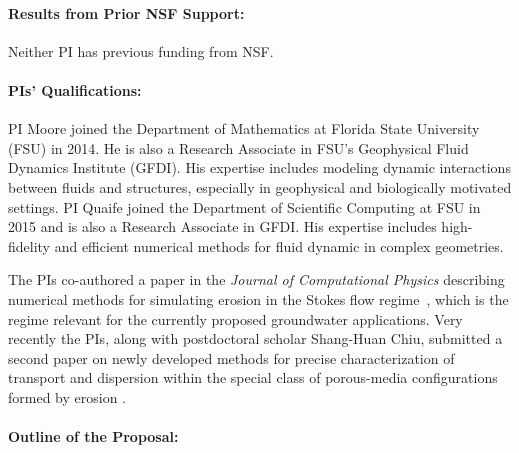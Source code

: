 \documentclass[11pt]{article}
\begin{document}
\paragraph{Results from Prior NSF Support:} Neither PI has previous funding from NSF.

\paragraph{PIs' Qualifications:} PI Moore joined the Department of Mathematics at Florida State University (FSU) in 2014. He is also a Research Associate in FSU's Geophysical Fluid Dynamics Institute (GFDI).  His expertise includes modeling dynamic interactions between fluids and structures, especially in geophysical and biologically motivated settings. PI Quaife joined the Department of Scientific Computing at FSU in 2015 and is also a Research Associate in GFDI. His expertise includes high-fidelity and efficient numerical methods for fluid dynamic in complex geometries.

The PIs co-authored a paper in the {\em Journal of Computational Physics} describing numerical methods for simulating erosion in the Stokes flow regime~\cite{Quaife2018}, which is the regime relevant for the currently proposed groundwater applications. Very recently the PIs, along with postdoctoral scholar Shang-Huan Chiu, submitted a second paper on newly developed methods for precise characterization of transport and dispersion within the special class of porous-media configurations formed by erosion \cite{chi-moo-qua2019}.


\paragraph{Outline of the Proposal:} 




\end{document}

